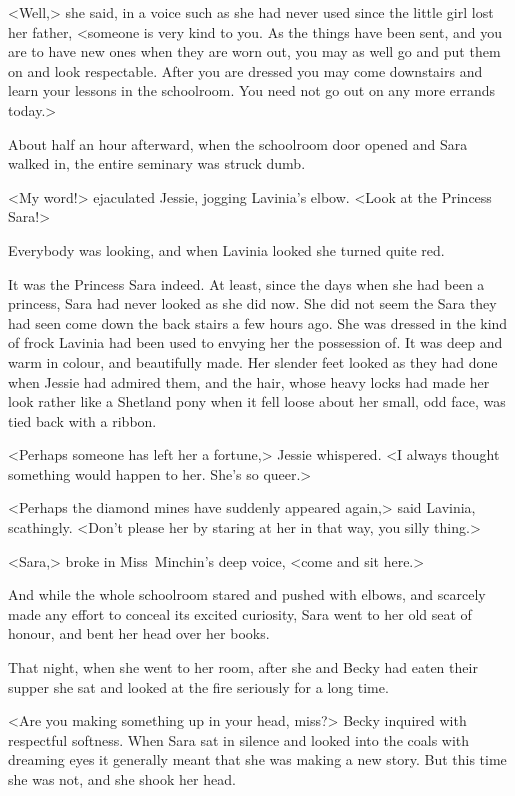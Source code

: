 <Well,> she said, in a voice such as she had never used since the little girl lost her father, <someone is very kind to you. As the things have been sent, and you are to have new ones when they are worn out, you may as well go and put them on and look respectable. After you are dressed you may come downstairs and learn your lessons in the schoolroom. You need not go out on any more errands today.>

About half an hour afterward, when the schoolroom door opened and Sara walked in, the entire seminary was struck dumb.

<My word!> ejaculated Jessie, jogging Lavinia's elbow. <Look at the Princess Sara!>

Everybody was looking, and when Lavinia looked she turned quite red.

It was the Princess Sara indeed. At least, since the days when she had been a princess, Sara had never looked as she did now. She did not seem the Sara they had seen come down the back stairs a few hours ago. She was dressed in the kind of frock Lavinia had been used to envying her the possession of. It was deep and warm in colour, and beautifully made. Her slender feet looked as they had done when Jessie had admired them, and the hair, whose heavy locks had made her look rather like a Shetland pony when it fell loose about her small, odd face, was tied back with a ribbon.

<Perhaps someone has left her a fortune,> Jessie whispered. <I always thought something would happen to her. She's so queer.>

<Perhaps the diamond mines have suddenly appeared again,> said Lavinia, scathingly. <Don't please her by staring at her in that way, you silly thing.>

<Sara,> broke in Miss~Minchin's deep voice, <come and sit here.>

And while the whole schoolroom stared and pushed with elbows, and scarcely made any effort to conceal its excited curiosity, Sara went to her old seat of honour, and bent her head over her books.

That night, when she went to her room, after she and Becky had eaten their supper she sat and looked at the fire seriously for a long time.

<Are you making something up in your head, miss?> Becky inquired with respectful softness. When Sara sat in silence and looked into the coals with dreaming eyes it generally meant that she was making a new story. But this time she was not, and she shook her head.

